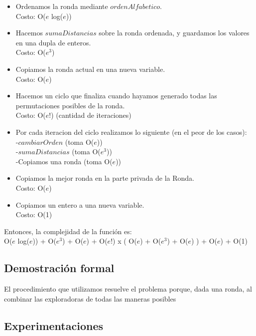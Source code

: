 \begin{itemize}
\item Ordenamos la ronda mediante $ordenAlfabetico$. \\
Costo: O($e$ log($e$))
\item Hacemos $sumaDistancias$ sobre la ronda ordenada, y guardamos los valores en una dupla de enteros.\\
Costo: O($e^3$)
\item Copiamos la ronda actual en una nueva variable. \\
Costo: O($e$)
\item Hacemos un ciclo que finaliza cuando hayamos generado todas las permutaciones posibles de la ronda. \\
Costo: O($e!$) (cantidad de iteraciones)
\item Por cada iteracion del ciclo realizamos lo siguiente (en el peor de los casos):\\
-$cambiarOrden$ (toma O($e$)) \\
-$sumaDistancias$ (toma O($e^3$)) \\
-Copiamos una ronda (toma O($e$))
\item Copiamos la mejor ronda en la parte privada de la Ronda. \\
Costo: O($e$)
\item Copiamos un entero a una nueva variable. \\
Costo: O(1)
\end{itemize}
Entonces, la complejidad de la función es:\\
O($e$ log($e$)) + O($e^3$) + O($e$) + O($e!$) x \big( O($e$) + O($e^3$) + O($e$) \big) + O($e$) + O(1) 









\subsection{Demostración formal}
El procedimiento que utilizamos resuelve el problema porque, dada una ronda, al combinar las exploradoras de todas las maneras 
posibles

\subsection{Experimentaciones}